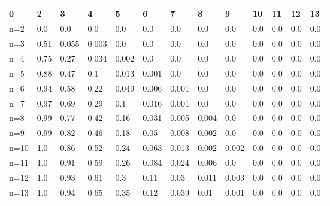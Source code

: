 \begin{tabular}{l|llllllllllll}
\toprule 
0 & 2 & 3 & 4 & 5 & 6 & 7 & 8 & 9 & 10 & 11 & 12 & 13 \\
\hline 
n=2 & 0.0 & 0.0 & 0.0 & 0.0 & 0.0 & 0.0 & 0.0 & 0.0 & 0.0 & 0.0 & 0.0 & 0.0 \\
n=3 & 0.51 & 0.055 & 0.003 & 0.0 & 0.0 & 0.0 & 0.0 & 0.0 & 0.0 & 0.0 & 0.0 & 0.0 \\
n=4 & 0.75 & 0.27 & 0.034 & 0.002 & 0.0 & 0.0 & 0.0 & 0.0 & 0.0 & 0.0 & 0.0 & 0.0 \\
n=5 & 0.88 & 0.47 & 0.1 & 0.013 & 0.001 & 0.0 & 0.0 & 0.0 & 0.0 & 0.0 & 0.0 & 0.0 \\
n=6 & 0.94 & 0.58 & 0.22 & 0.049 & 0.006 & 0.001 & 0.0 & 0.0 & 0.0 & 0.0 & 0.0 & 0.0 \\
n=7 & 0.97 & 0.69 & 0.29 & 0.1 & 0.016 & 0.001 & 0.0 & 0.0 & 0.0 & 0.0 & 0.0 & 0.0 \\
n=8 & 0.99 & 0.77 & 0.42 & 0.16 & 0.031 & 0.005 & 0.004 & 0.0 & 0.0 & 0.0 & 0.0 & 0.0 \\
n=9 & 0.99 & 0.82 & 0.46 & 0.18 & 0.05 & 0.008 & 0.002 & 0.0 & 0.0 & 0.0 & 0.0 & 0.0 \\
n=10 & 1.0 & 0.86 & 0.52 & 0.24 & 0.063 & 0.013 & 0.002 & 0.002 & 0.0 & 0.0 & 0.0 & 0.0 \\
n=11 & 1.0 & 0.91 & 0.59 & 0.26 & 0.084 & 0.024 & 0.006 & 0.0 & 0.0 & 0.0 & 0.0 & 0.0 \\
n=12 & 1.0 & 0.93 & 0.61 & 0.3 & 0.11 & 0.03 & 0.011 & 0.003 & 0.0 & 0.0 & 0.0 & 0.0 \\
n=13 & 1.0 & 0.94 & 0.65 & 0.35 & 0.12 & 0.039 & 0.01 & 0.001 & 0.0 & 0.0 & 0.0 & 0.0 \\
\bottomrule 
\end{tabular}

